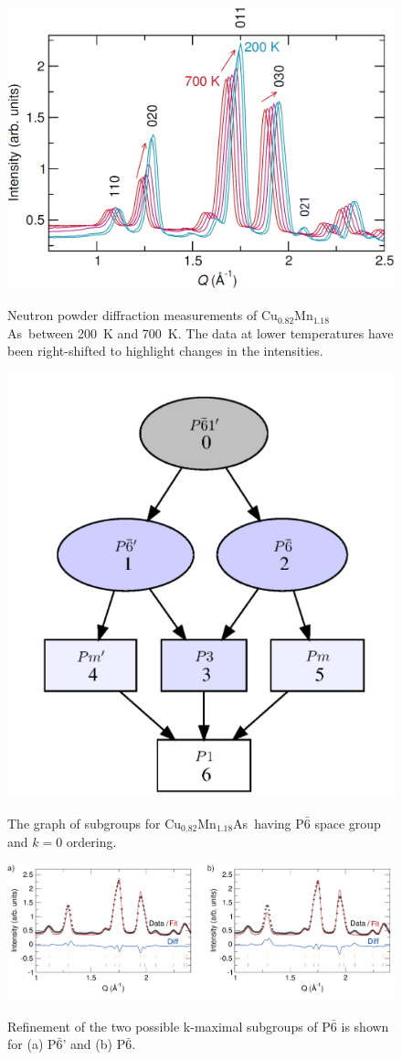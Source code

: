 \documentclass[letterpaper,10pt,doublespacing,edeposit]{uiucthesis2020}
\newcommand*{\cumnas}{Cu$_{0.82}$Mn$_{1.18}$As}
\begin{document}
\begin{mainmatter}

\begin{figure}
\centering\includegraphics[width=0.7\columnwidth]{figures/ch4/WAND_data.png} \\
\caption{\label{fig:WAND_data}
Neutron powder diffraction measurements of \cumnas\ between 200~K and 700~K. The data at lower temperatures have been right-shifted to highlight changes in the intensities.
}
\end{figure}


\begin{figure}
\centering\includegraphics[width=0.5\columnwidth]{figures/ch4/subgraph_cumnas.png} \\
\caption{\label{fig:subgraph_cumnas}
The graph of subgroups for \cumnas\ having P$\bar{6}$ space group and $k=0$ ordering.
}
\end{figure}


\begin{figure}
\centering\includegraphics[width=\columnwidth]{figures/ch4/wand_refinement.png} \\
\caption{\label{fig:wand_refinement}
Refinement of the two possible k-maximal subgroups of P$\bar{6}$ is shown for (a) P$\bar{6}$' and (b) P$\bar{6}$.
}
\end{figure}


\end{mainmatter}
\end{document}
